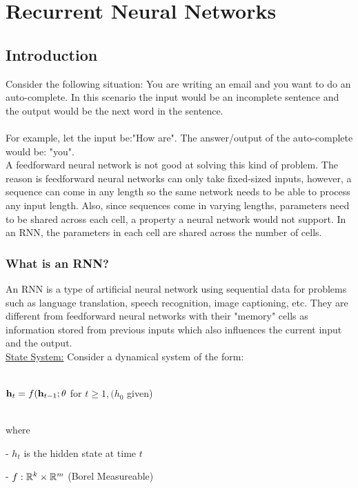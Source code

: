 




\chapter{Recurrent Neural Networks}

\section{Introduction}
\noindent Consider the following situation: You are writing an email and you want to do an auto-complete. In this scenario the input would be an incomplete sentence and the output would be the next word in the sentence.\\
\\For example, let the input be:"How are". The answer/output of the auto-complete would be: "you". \\


\noindent A feedforward neural network is not good at solving this kind of problem. The reason is feedforward neural networks can only take fixed-sized inputs, however, a sequence can come in any length so the same network needs to be able to process any input length. Also, since sequences come in varying lengths, parameters need to be shared across each cell, a property a neural network would not support. In an RNN, the parameters in each cell are shared across the number of cells.   \\

\subsection{What is an RNN?} 
 An RNN is a type of artificial neural network using sequential data for problems such as language translation, speech recognition, image captioning, etc. They are different from feedforward neural networks with their "memory" cells as information stored from previous inputs which also influences the current input and the output.  \\

\underline{State System:} Consider a dynamical system of the form:\\
\centerline{\\$\vh_t = f(\vh_{t-1}; \theta$ for $t \geq 1, (h_0 $ given)}
~\\ where 

- $h_t$ is the hidden state at time $t$

- $f: \R^{k} \times \R^{m}$    (Borel Measureable)

